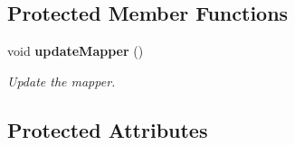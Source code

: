 \subsection*{Protected Member Functions}
\begin{DoxyCompactItemize}
\item 
void {\bf update\-Mapper} ()\label{classCALICE_1_1PedestalProcessor_a3efefa4461047861ad09e26ff06c47ff}

\begin{DoxyCompactList}\small\item\em Update the mapper. \end{DoxyCompactList}\end{DoxyCompactItemize}
\subsection*{Protected Attributes}
